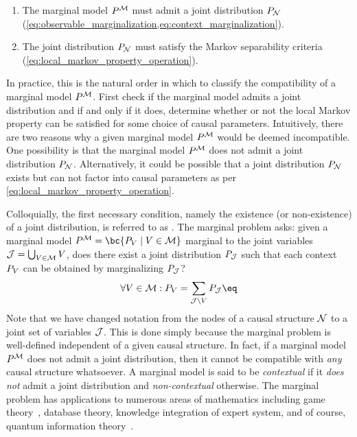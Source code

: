 \documentclass[aps, 10pt, english, twoside, pra, nofootinbib, tightenlines, longbibliography, superscriptaddress]{revtex4-1}
\begin{document}
    \begin{enumerate}
        \item The marginal model $\prob^{\mscenario}$ must admit a joint distribution $\prob[\nodes]$ (\cref{eq:observable_marginalization,eq:context_marginalization}).
        \item The joint distribution $\prob[\nodes]$ must satisfy the Markov separability criteria (\cref{eq:local_markov_property_operation}).
    \end{enumerate}
    In practice, this is the natural order in which to classify the compatibility of a marginal model $\prob^{\mscenario}$. First check if the marginal model admits a joint distribution and if and only if it does, determine whether or not the local Markov property can be satisfied for some choice of causal parameters. Intuitively, there are two reasons why a given marginal model $\prob^{\mscenario}$ would be deemed incompatible. One possibility is that the marginal model $\prob^{\mscenario}$ does not admit a joint distribution $\prob[\nodes]$. Alternatively, it could be possible that a joint distribution $\prob[\nodes]$ exists but can not factor into causal parameters as per \cref{eq:local_markov_property_operation}.

    Colloquially, the first necessary condition, namely the existence (or non-existence) of a joint distribution, is referred to as . The marginal problem asks: given a marginal model $\prob^{\mscenario} = \bc{\prob[V] \mid V \in \mscenario}$ marginal to the joint variables $\mathcal{J} = \bigcup_{V \in \mathcal{M}} V$, does there exist a joint distribution $\prob[\jointvar]$ such that each context $\prob[V]$ can be obtained by marginalizing $\prob[\jointvar]$?
    \[ \forall V \in \mscenario : \prob[V] = \sum_{\jointvar \setminus V} \prob[\jointvar] \eq \label{eq:def:marginal_problem}\]
    Note that we have changed notation from the nodes of a causal structure $\mathcal{N}$ to a joint set of variables $\mathcal{J}$. This is done simply because the marginal problem is well-defined independent of a given causal structure. In fact, if a marginal model $\prob^{\mscenario}$ does not admit a joint distribution, then it cannot be compatible with \textit{any} causal structure whatsoever. A marginal model is said to be \textit{contextual} if it \textit{does not} admit a joint distribution and \textit{non-contextual} otherwise. The marginal problem has applications to numerous areas of mathematics including game theory~\cite{Vorobev_1962}, database theory, knowledge integration of expert system, and of course, quantum information theory~\cite{Fritz_2011}.
\end{document}
